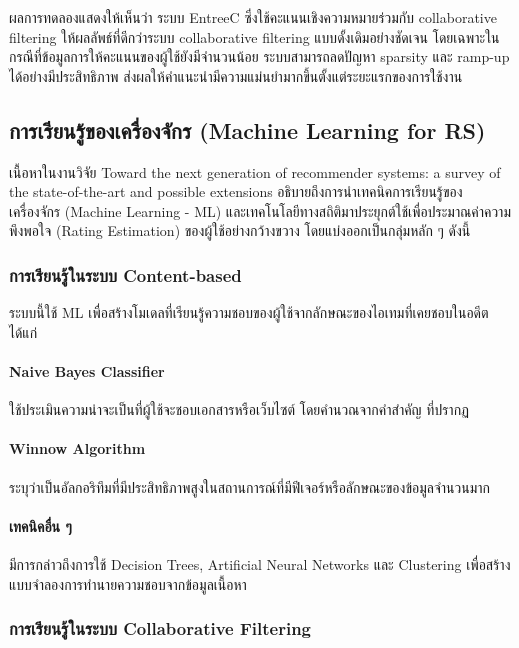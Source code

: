 ผลการทดลองแสดงให้เห็นว่า ระบบ EntreeC ซึ่งใช้คะแนนเชิงความหมายร่วมกับ collaborative filtering ให้ผลลัพธ์ที่ดีกว่าระบบ collaborative filtering แบบดั้งเดิมอย่างชัดเจน โดยเฉพาะในกรณีที่ข้อมูลการให้คะแนนของผู้ใช้ยังมีจำนวนน้อย ระบบสามารถลดปัญหา sparsity และ ramp-up ได้อย่างมีประสิทธิภาพ ส่งผลให้คำแนะนำมีความแม่นยำมากขึ้นตั้งแต่ระยะแรกของการใช้งาน 

\subsection{การเรียนรู้ของเครื่องจักร (Machine Learning for RS)}

เนื้อหาในงานวิจัย Toward the next generation of recommender systems: a survey of the state-of-the-art and possible extensions อธิบายถึงการนำเทคนิคการเรียนรู้ของเครื่องจักร (Machine Learning - ML) และเทคโนโลยีทางสถิติมาประยุกต์ใช้เพื่อประมาณค่าความพึงพอใจ (Rating Estimation) ของผู้ใช้อย่างกว้างขวาง โดยแบ่งออกเป็นกลุ่มหลัก ๆ ดังนี้ \cite{nextgen_nd} 


\subsubsection{การเรียนรู้ในระบบ Content-based}

ระบบนี้ใช้ ML เพื่อสร้างโมเดลที่เรียนรู้ความชอบของผู้ใช้จากลักษณะของไอเทมที่เคยชอบในอดีต ได้แก่ \cite{nextgen_nd} 

\paragraph{Naive Bayes Classifier}
ใช้ประเมินความน่าจะเป็นที่ผู้ใช้จะชอบเอกสารหรือเว็บไซต์ โดยคำนวณจากคำสำคัญ ที่ปรากฏ 

\paragraph{Winnow Algorithm}
ระบุว่าเป็นอัลกอริทึมที่มีประสิทธิภาพสูงในสถานการณ์ที่มีฟีเจอร์หรือลักษณะของข้อมูลจำนวนมาก 

\paragraph{เทคนิคอื่น ๆ}
มีการกล่าวถึงการใช้ Decision Trees, Artificial Neural Networks และ Clustering เพื่อสร้างแบบจำลองการทำนายความชอบจากข้อมูลเนื้อหา 


\subsubsection{การเรียนรู้ในระบบ Collaborative Filtering}

